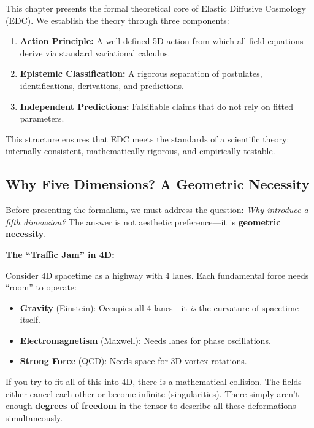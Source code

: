\vspace{1em}

\noindent This chapter presents the formal theoretical core of Elastic Diffusive Cosmology (EDC). We establish the theory through three components:

\begin{enumerate}
    \item \textbf{Action Principle:} A well-defined 5D action from which all field equations derive via standard variational calculus.
    \item \textbf{Epistemic Classification:} A rigorous separation of postulates, identifications, derivations, and predictions.
    \item \textbf{Independent Predictions:} Falsifiable claims that do not rely on fitted parameters.
\end{enumerate}

This structure ensures that EDC meets the standards of a scientific theory: internally consistent, mathematically rigorous, and empirically testable.


\subsection{Why Five Dimensions? A Geometric Necessity}
\label{subsec:why_5d}

Before presenting the formalism, we must address the question: \textit{Why introduce a fifth dimension?} The answer is not aesthetic preference---it is \textbf{geometric necessity}.

\begin{tcolorbox}[colback=red!5,colframe=red!70!black,title=The Problem: Unification is Impossible in 4D]

\textbf{The ``Traffic Jam'' in 4D:}

Consider 4D spacetime as a highway with 4 lanes. Each fundamental force needs ``room'' to operate:

\begin{itemize}
    \item \textbf{Gravity} (Einstein): Occupies all 4 lanes---it \textit{is} the curvature of spacetime itself.
    \item \textbf{Electromagnetism} (Maxwell): Needs lanes for phase oscillations.
    \item \textbf{Strong Force} (QCD): Needs space for 3D vortex rotations.
\end{itemize}

If you try to fit all of this into 4D, there is a mathematical collision. The fields either cancel each other or become infinite (singularities). There simply aren't enough \textbf{degrees of freedom} in the tensor to describe all these deformations simultaneously.

\end{tcolorbox}

